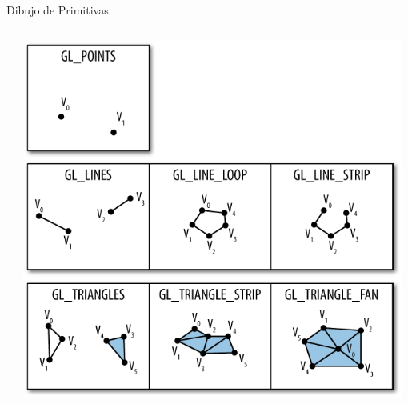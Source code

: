 \documentclass[aspectratio=169,compress]{beamer}
\begin{document}
\begin{frame}{Dibujo de Primitivas}
\begin{columns}
\begin{column}{0.3\textwidth}
\end{column}
\begin{column}{0.3\textwidth}
\begin{center}
 \includegraphics[width=0.98\textwidth]{FigsOpenGL/PrimitiavasOpenGL}
 \end{center}
\end{column}
\end{columns}



\end{frame}
\end{document}
